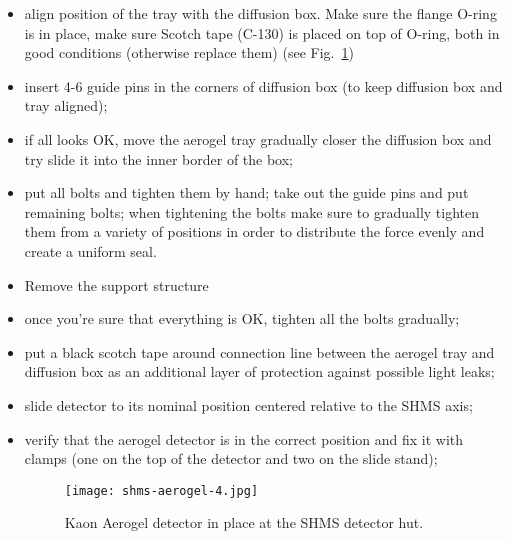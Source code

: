 {\begin{itemize}
\begin{figure}
\begin{center}
\texttt{[image: shms-aerogel-3a.jpg]}
\texttt{[image: shms-aerogel-3b.jpg]}
\caption{\label{fig:shms-aerogel-3}Illustration of the alignment of
  the aerogel tray with the diffusion box.}
\end{center}
\end{figure}


  \item align position of the tray with the diffusion box. Make sure
    the flange O-ring is in place, make sure Scotch tape (C-130) is
    placed on top of O-ring, both in good conditions (otherwise
    replace them) (see Fig.~\ref{fig:shms-aerogel-3})
  \item insert 4-6 guide pins in the corners of diffusion box (to keep
    diffusion box and tray aligned);
  \item if all looks OK, move the aerogel tray gradually closer the
    diffusion box and try slide it into the inner border of the box;
  \item put all bolts and tighten them by hand; take out the guide
    pins and put remaining bolts; when tightening the bolts make sure
    to gradually tighten them from a variety of positions in order to
    distribute the force evenly and create a uniform seal.
\item Remove the support structure
\item once you're sure that
  everything is OK, tighten all the bolts gradually;
\item put a black
  scotch tape around connection line between the aerogel tray and
  diffusion box as an additional layer of protection against
  possible light leaks;
\item slide detector to its nominal position
  centered relative to the SHMS axis;
\item verify that the aerogel detector
  is in the correct position and fix it with clamps (one on the top
  of the detector and two on the slide stand);

\begin{figure}
\begin{center}
\texttt{[image: shms-aerogel-4.jpg]}
\caption{\label{fig:shms-aerogel-4}Kaon Aerogel detector in place at the SHMS detector hut.}
\end{center}
\end{figure}


\end{itemize}}
